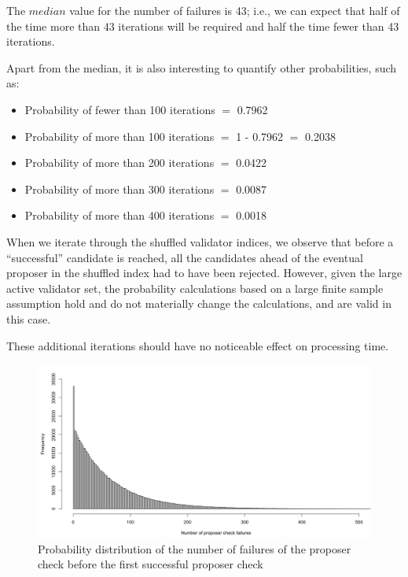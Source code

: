 \documentclass[submission,copyright,creativecommons]{eptcs}
\begin{document}
The $median$ value for the number of failures is 43; i.e., we can expect that half of the time more than 43 iterations will be required and half the time fewer than 43 iterations.

Apart from the median, it is also interesting to quantify other probabilities, such as:
\begin{itemize}[noitemsep]
\item Probability of fewer than 100 iterations 
$=$ 0.7962
\item Probability of more than 100 iterations
$=$ 1 - 0.7962 $=$ 0.2038
\item Probability of more than 200 iterations
$=$ 0.0422
\item Probability of more than 300 iterations
$=$ 0.0087
\item Probability of more than 400 iterations
$=$ 0.0018
\end{itemize}


When we iterate through the shuffled validator indices, we observe that before a ``successful'' candidate is reached, all the candidates ahead of the eventual proposer in the shuffled index had to have been rejected.
However, given the large active validator set, the probability calculations based on a large finite sample assumption hold and do not materially change the calculations, and are valid in this case.

These additional iterations should have no noticeable effect on processing time.

\begin{figure}[htbp]
\begin{center}
\includegraphics[width=\linewidth]{images/proposer_negbinomial.png}
\caption{Probability distribution of the number of failures of the proposer check before the first successful proposer check}
\label{fig:negbin}
\end{center}
\end{figure}
\end{document}
